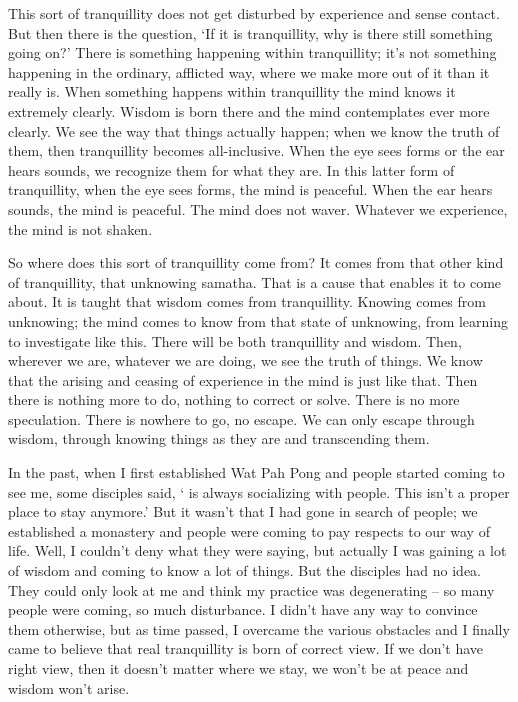 This sort of tranquillity does not get disturbed by experience and sense contact. But then there is the question, `If it is tranquillity, why is there still something going on?' There is something happening within tranquillity; it's not something happening in the ordinary, afflicted way, where we make more out of it than it really is. When something happens within tranquillity the mind knows it extremely clearly. Wisdom is born there and the mind contemplates ever more clearly. We see the way that things actually happen; when we know the truth of them, then tranquillity becomes all-inclusive. When the eye sees forms or the ear hears sounds, we recognize them for what they are. In this latter form of tranquillity, when the eye sees forms, the mind is peaceful. When the ear hears sounds, the mind is peaceful. The mind does not waver. Whatever we experience, the mind is not shaken.

So where does this sort of tranquillity come from? It comes from that other kind of tranquillity, that unknowing samatha. That is a cause that enables it to come about. It is taught that wisdom comes from tranquillity. Knowing comes from unknowing; the mind comes to know from that state of unknowing, from learning to investigate like this. There will be both tranquillity and wisdom. Then, wherever we are, whatever we are doing, we see the truth of things. We know that the arising and ceasing of experience in the mind is just like that. Then there is nothing more to do, nothing to correct or solve. There is no more speculation. There is nowhere to go, no escape. We can only escape through wisdom, through knowing things as they are and transcending them.

In the past, when I first established Wat Pah Pong and people started coming to see me, some disciples said, ` is always socializing with people. This isn't a proper place to stay anymore.' But it wasn't that I had gone in search of people; we established a monastery and people were coming to pay respects to our way of life. Well, I couldn't deny what they were saying, but actually I was gaining a lot of wisdom and coming to know a lot of things. But the disciples had no idea. They could only look at me and think my practice was degenerating -- so many people were coming, so much disturbance. I didn't have any way to convince them otherwise, but as time passed, I overcame the various obstacles and I finally came to believe that real tranquillity is born of correct view. If we don't have right view, then it doesn't matter where we stay, we won't be at peace and wisdom won't arise.

